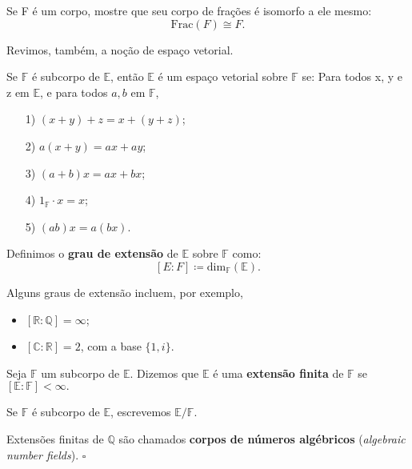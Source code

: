 \documentclass[../algebraIII_notes.tex]{subfiles}
\begin{document}
\begin{exr}
	Se F é um corpo, mostre que seu corpo de frações é isomorfo a ele mesmo:
	\[
		\mathrm{Frac}(F)\cong F.
	\]
\end{exr}

Revimos, também, a noção de espaço vetorial.
\begin{def*}
	Se \(\mathbb{F}\) é subcorpo de \(\mathbb{E}\), então \(\mathbb{E}\) é um espaço vetorial sobre \(\mathbb{F}\) se:
	Para todos x, y e z em \(\mathbb{E}\), e para todos \(a, b\) em \(\mathbb{F}\),
	\begin{itemize}
		\item[1)]  \((x+y)+z = x + (y+z)\);
		\item[2)]  \(a(x+y) = ax + ay\);
		\item[3)] \((a+b)x = ax + bx\);
		\item[4)] \(1_{\mathbb{F}}\cdot x = x\);
		\item[5)] \((ab)x = a(bx)\).
	\end{itemize}
\end{def*}
\begin{def*}
	Definimos o \textbf{grau de extensão} de \(\mathbb{E}\) sobre \(\mathbb{F}\) como:
	\[
		[E:F]\coloneqq \mathrm{dim}_{\mathbb{F}}(\mathbb{E}).
	\]
\end{def*}
\begin{example}
	Alguns graus de extensão incluem, por exemplo,
	\begin{itemize}
		\item \([\mathbb{R}: \mathbb{Q}] = \infty\);
		\item \([\mathbb{C}:\mathbb{R}] = 2\), com a base \(\{1, i\}\).
	\end{itemize}
\end{example}
\begin{def*}
	Seja \(\mathbb{F}\) um subcorpo de \(\mathbb{E}\). Dizemos que \(\mathbb{E}\) é uma \textbf{extensão finita} de \(\mathbb{F}\) se \([\mathbb{E}:\mathbb{F}] < \infty.\)
\end{def*}
Se \(\mathbb{F}\) é subcorpo de \(\mathbb{E}\), escrevemos \(\mathbb{E}/\mathbb{F}.\)
\begin{def*}
	Extensões finitas de \(\mathbb{Q}\) são chamados \textbf{corpos de números algébricos} (\textit{algebraic number fields}). \(\square\)
\end{def*}
\end{document}
